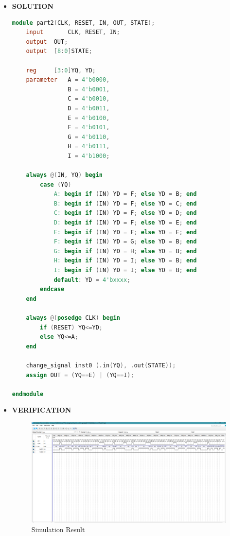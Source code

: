 \begin{itemize}
\begin{enumerate}
\begin{figure}[h]
                \end{figure}
        \end{enumerate}
\clearpage
    \item []\textbf{SOLUTION}
        \begin{lstlisting}[language=Verilog]
module part2(CLK, RESET, IN, OUT, STATE);
	input		CLK, RESET, IN;
	output	OUT;
	output	[8:0]STATE;
	
	reg		[3:0]YQ, YD;
	parameter 	A = 4'b0000, 
                B = 4'b0001, 
                C = 4'b0010, 
                D = 4'b0011, 
                E = 4'b0100, 
                F = 4'b0101, 
                G = 4'b0110, 
                H = 4'b0111, 
                I = 4'b1000;
	
	always @(IN, YQ) begin
		case (YQ)
			A: begin if (IN) YD = F; else YD = B; end
			B: begin if (IN) YD = F; else YD = C; end
			C: begin if (IN) YD = F; else YD = D; end
			D: begin if (IN) YD = F; else YD = E; end
			E: begin if (IN) YD = F; else YD = E; end
			F: begin if (IN) YD = G; else YD = B; end
			G: begin if (IN) YD = H; else YD = B; end
			H: begin if (IN) YD = I; else YD = B; end
			I: begin if (IN) YD = I; else YD = B; end
			default: YD = 4'bxxxx;
		endcase
	end
	
	always @(posedge CLK) begin
		if (RESET) YQ<=YD;
		else YQ<=A;
	end
	
	change_signal inst0 (.in(YQ), .out(STATE));
	assign OUT = (YQ==E) | (YQ==I);
	
endmodule
        \end{lstlisting}
\clearpage
    \item []\textbf{VERIFICATION}
        \begin{figure}[h]
            \centering
            \includegraphics[scale = 0.3]{source/picture/Lab7/bai7_1.png}
            \caption{Simulation Result}
        \end{figure}
\end{itemize}
\newpage




